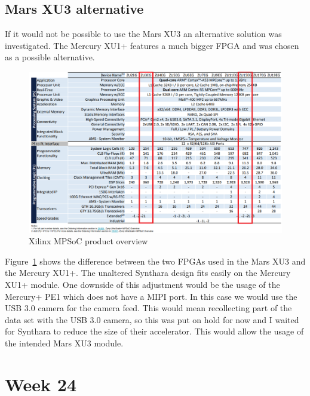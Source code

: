 \subsection{Mars XU3 alternative}
If it would not be possible to use the Mars XU3 an alternative solution was investigated. The Mercury XU1+ features a much bigger \ac{FPGA} and was chosen as a possible alternative.
\begin{figure}[!htb]
	\centering
		\includegraphics[width=\textwidth]{bilder/MPSoC_product_guide.png}
		\caption{Xilinx \acs{MPSoC} product overview \cite{mpsoc}}
		\label{fig:mpsoc_overview}
\end{figure}
Figure~\ref{fig:mpsoc_overview} shows the difference between the two \acp{FPGA} used in the Mars XU3 and the Mercury XU1+. The unaltered Synthara design fits easily on the Mercury XU1+ module. One downside of this adjustment would be the usage of the Mercury+ PE1 which does not have a \ac{MIPI} port. In this case we would use the USB 3.0 camera for the camera feed. This would mean recollecting part of the data set with the USB 3.0 camera, so this was put on hold for now and I waited for Synthara to reduce the size of their accelerator. This would allow the usage of the intended Mars XU3 module.

\section{Week 24}
